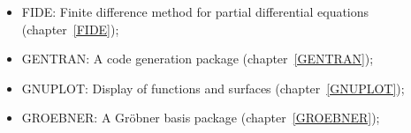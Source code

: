 \begin{itemize}
\item
{FIDE: Finite difference method for partial differential equations}
(chapter~\ref{FIDE}); 

\item
{GENTRAN: A code generation package} (chapter~\ref{GENTRAN});

\item
{GNUPLOT: Display of functions and surfaces}
(chapter~\ref{GNUPLOT}); 

\item
{GROEBNER: A Gr\"obner basis package} (chapter~\ref{GROEBNER});


\end{itemize}
